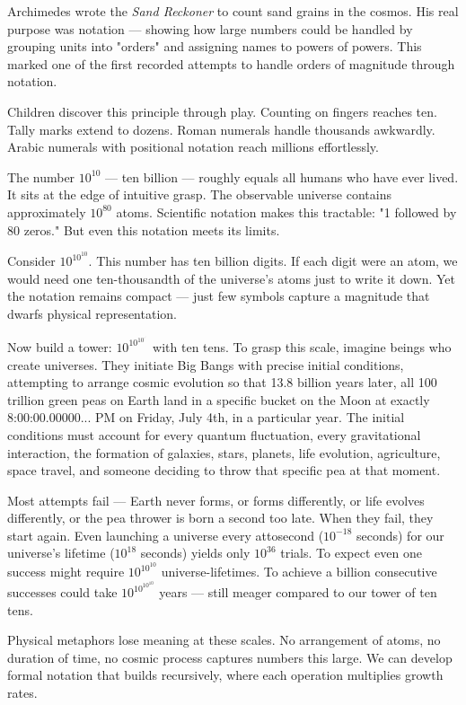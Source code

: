 Archimedes wrote the \emph{Sand Reckoner} to count sand grains in the cosmos. His real purpose was notation — showing how large numbers could be handled by grouping units into "orders" and assigning names to powers of powers. This marked one of the first recorded attempts to handle orders of magnitude through notation.

Children discover this principle through play. Counting on fingers reaches ten. Tally marks extend to dozens. Roman numerals handle thousands awkwardly. Arabic numerals with positional notation reach millions effortlessly.

The number $10^{10}$ — ten billion — roughly equals all humans who have ever lived. It sits at the edge of intuitive grasp. The observable universe contains approximately $10^{80}$ atoms. Scientific notation makes this tractable: "1 followed by 80 zeros." But even this notation meets its limits.

Consider $10^{10^{10}}$. This number has ten billion digits. If each digit were an atom, we would need one ten-thousandth of the universe's atoms just to write it down. Yet the notation remains compact — just few symbols capture a magnitude that dwarfs physical representation.

Now build a tower: $10^{10^{10^{\cdot^{\cdot^{\cdot}}}}}$ with ten tens. To grasp this scale, imagine beings who create universes. They initiate Big Bangs with precise initial conditions, attempting to arrange cosmic evolution so that 13.8 billion years later, all 100 trillion green peas on Earth land in a specific bucket on the Moon at exactly 8:00:00.00000... PM on Friday, July 4th, in a particular year. The initial conditions must account for every quantum fluctuation, every gravitational interaction, the formation of galaxies, stars, planets, life evolution, agriculture, space travel, and someone deciding to throw that specific pea at that moment.

Most attempts fail — Earth never forms, or forms differently, or life evolves differently, or the pea thrower is born a second too late. When they fail, they start again. Even launching a universe every attosecond ($10^{-18}$ seconds) for our universe's lifetime ($10^{18}$ seconds) yields only $10^{36}$ trials. To expect even one success might require $10^{10^{10}}$ universe-lifetimes. To achieve a billion consecutive successes could take $10^{10^{10^{10}}}$ years — still meager compared to our tower of ten tens.

Physical metaphors lose meaning at these scales. No arrangement of atoms, no duration of time, no cosmic process captures numbers this large. We can develop formal notation that builds recursively, where each operation multiplies growth rates.

